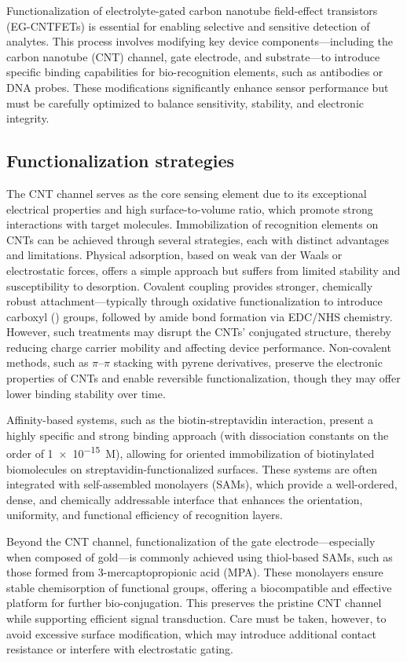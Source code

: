 Functionalization of electrolyte-gated carbon nanotube field-effect transistors (EG-CNTFETs) is essential for enabling selective and sensitive detection of analytes. This process involves modifying key device components—including the carbon nanotube (CNT) channel, gate electrode, and substrate—to introduce specific binding capabilities for bio-recognition elements, such as antibodies or DNA probes. These modifications significantly enhance sensor performance but must be carefully optimized to balance sensitivity, stability, and electronic integrity.

\subsection{Functionalization strategies}

The CNT channel serves as the core sensing element due to its exceptional electrical properties and high surface-to-volume ratio, which promote strong interactions with target molecules. Immobilization of recognition elements on CNTs can be achieved through several strategies, each with distinct advantages and limitations. Physical adsorption, based on weak van der Waals or electrostatic forces, offers a simple approach but suffers from limited stability and susceptibility to desorption. Covalent coupling provides stronger, chemically robust attachment—typically through oxidative functionalization to introduce carboxyl () groups, followed by amide bond formation via EDC/NHS chemistry. However, such treatments may disrupt the CNTs' conjugated structure, thereby reducing charge carrier mobility and affecting device performance. Non-covalent methods, such as $\pi$--$\pi$ stacking with pyrene derivatives, preserve the electronic properties of CNTs and enable reversible functionalization, though they may offer lower binding stability over time.

Affinity-based systems, such as the biotin-streptavidin interaction, present a highly specific and strong binding approach (with dissociation constants on the order of \SI{1e-15}{M}), allowing for oriented immobilization of biotinylated biomolecules on streptavidin-functionalized surfaces. These systems are often integrated with self-assembled monolayers (SAMs), which provide a well-ordered, dense, and chemically addressable interface that enhances the orientation, uniformity, and functional efficiency of recognition layers.

Beyond the CNT channel, functionalization of the gate electrode—especially when composed of gold—is commonly achieved using thiol-based SAMs, such as those formed from 3-mercaptopropionic acid (MPA). These monolayers ensure stable chemisorption of functional groups, offering a biocompatible and effective platform for further bio-conjugation. This preserves the pristine CNT channel while supporting efficient signal transduction. Care must be taken, however, to avoid excessive surface modification, which may introduce additional contact resistance or interfere with electrostatic gating.

